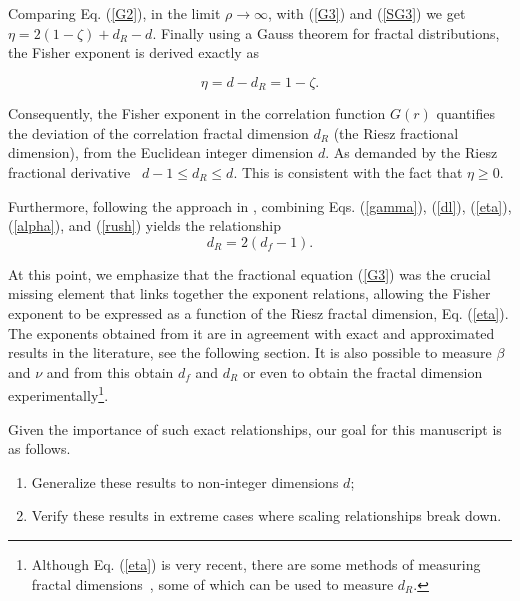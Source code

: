 \documentclass[pre,aps,twocolumn,showpacs,floatfix,nofootinbib,superscriptaddress,linenumbers]{revtex4-1}
\begin{document}
\begin{enumerate}
Comparing Eq. (\ref{G2}), in the limit $\rho \rightarrow \infty$, with (\ref{G3}) and  (\ref{SG3}) we get $ \eta=2(1-\zeta)+d_R-d$. Finally using a Gauss theorem for fractal distributions, the Fisher exponent is derived exactly as~\cite{Lima24}
 
\begin{equation}
\label{eta}
 \eta=d-d_R=1-\zeta.
\end{equation}


\end{enumerate}
Consequently, the Fisher exponent in the correlation function $G(r)$ quantifies the deviation of the correlation fractal dimension $d_R$ (the  Riesz fractional dimension), from the Euclidean integer dimension $d$. As demanded by the Riesz fractional derivative~\cite{Muslih10,Muslih10b}  $d-1 \leq d_R\leq d$. This is consistent with the fact that $\eta \geq 0$.

Furthermore, following the approach in \cite{Lima24}, combining Eqs. (\ref{gamma}), (\ref{dl}), (\ref{eta}), (\ref{alpha}), and (\ref{rush}) yields the relationship
\begin{equation}
\label{dl2}
    d_R=2(d_f-1).
\end{equation}

At this point, we emphasize that the fractional equation (\ref{G3}) was the crucial missing element that links together the exponent relations, allowing the Fisher exponent to be expressed as a function of the Riesz fractal dimension, Eq. (\ref{eta}). The exponents obtained from it are in agreement with exact and approximated results in the literature, see the following section. It is also possible to measure $\beta$ and $\nu$ and from this obtain $d_f$ and $d_R$ or even to obtain the fractal dimension experimentally\footnote[1]{Although Eq. (\ref{eta}) is very recent, there are some methods of measuring fractal dimensions~\cite{Lin89,Nayak17,Dumouchel05,Pham23}, some of which can be used to measure $d_R$.}.

Given the importance of such exact relationships, our goal for this manuscript is as follows.
\begin{enumerate}
    \item Generalize these  results to non-integer dimensions $d$;
    \item  Verify these results in extreme cases where scaling relationships break down.
\end{enumerate}

\end{document}
